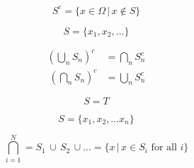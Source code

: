 






\[\begin{equation} S^c = \{ x \in \Omega \, | \, x \notin S \} \end{equation}\]

\[\begin{equation} S = \{x_1, x_2, \dotso \} \end{equation}\]

\[\begin{align} \left( \bigcup_n S_n \right)^c &= \bigcap_n S_n^c \\\ \left( \bigcap_n S_n \right)^c &= \bigcup_n S_n^c \end{align}\]

\[\begin{equation} S = T \end{equation}\]

\[\begin{equation} S = \{x_1, x_2, \dotso x_n \} \end{equation}\]

\[\begin{equation} \bigcap_{i=1}^N = S_1 \, \cup \, S_2 \, \cup \dotso = \{ x \, | \, x \in S_i \text{ for all } i\} \end{equation}\]

